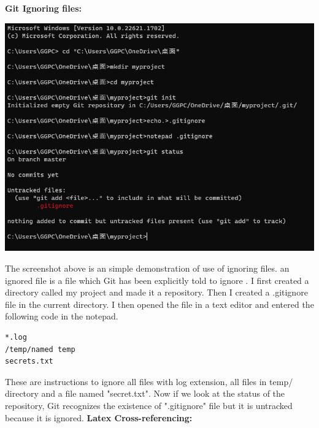 \documentclass[a4paper, 11pt]{report}
\begin{document}
\textbf{Git Ignoring files:}
\begin{center}
    \includegraphics[scale=0.7]{ignore.png}
\end{center}
The screenshot above is an simple demonstration of use of ignoring files. an ignored file is a file which Git has been explicitly told to ignore \cite{atlassian-gitignore}. I first created a directory called my project and made it a repository. Then I created a .gitignore file in the current directory. I then opened the file in a text editor and entered the following code in the notepad.
\begin{verbatim}
*.log
/temp/named temp
secrets.txt
\end{verbatim}
These are instructions to ignore all files with log extension, all files in temp/ directory and a file named "secret.txt". Now if we look at the status of the repository, Git recognizes the existence of ".gitignore" file but it is untracked because it is ignored.
\newline
\textbf{Latex Cross-referencing:}
\end{document}

